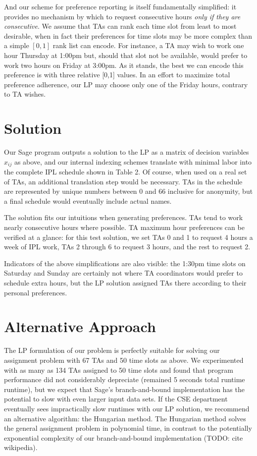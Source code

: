 \documentclass{article}
\begin{document}
\begin{multicols}{2}
And our scheme for preference reporting is itself fundamentally simplified: it provides no mechanism by which to request consecutive hours \textit{only if they are consecutive}. We assume that TAs can rank each time slot from least to most desirable, when in fact their preferences for time slots may be more complex than a simple $[0, 1]$ rank list can encode. For instance, a TA may wish to work one hour Thursday at 1:00pm but, should that slot not be available, would prefer to work two hours on Friday at 3:00pm. As it stands, the best we can encode this preference is with three relative [0,1] values. In an effort to maximize total preference adherence, our LP may choose only one of the Friday hours, contrary to TA wishes.

\section*{Solution}

Our Sage program outputs a solution to the LP as a matrix of decision variables $x_{ij}$ as above, and our internal indexing schemes translate with minimal labor into the complete IPL schedule shown in Table 2. Of course, when used on a real set of TAs, an additional translation step would be necessary. TAs in the schedule are represented by unique numbers between 0 and 66 inclusive for anonymity, but a final schedule would eventually include actual names.

The solution fits our intuitions when generating preferences. TAs tend to work nearly consecutive hours where possible. TA maximum hour preferences can be verified at a glance: for this test solution, we set TAs 0 and 1 to request 4 hours a week of IPL work, TAs 2 through 6 to request 3 hours, and the rest to request 2.

Indicators of the above simplifications are also visible: the 1:30pm time slots on Saturday and Sunday are certainly not where TA coordinators would prefer to schedule extra hours, but the LP solution assigned TAs there according to their personal preferences.

\section*{Alternative Approach}

The LP formulation of our problem is perfectly suitable for solving our assignment problem with 67 TAs and 50 time slots as above. We experimented with as many as 134 TAs assigned to 50 time slots and found that program performance did not considerably depreciate (remained 5 seconds total runtime runtime), but we expect that Sage's branch-and-bound implementation has the potential to slow with even larger input data sets. If the CSE department eventually sees impractically slow runtimes with our LP solution, we recommend an alternative algorithm: the Hungarian method. The Hungarian method solves the general assignment problem in polynomial time, in contrast to the potentially exponential complexity of our branch-and-bound implementation (TODO: cite wikipedia).


\end{multicols}
\end{document}
